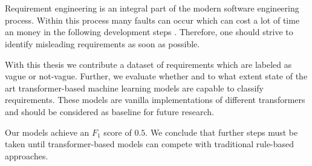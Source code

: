 \chapter{\abstractname}

Requirement engineering is an integral part of the modern software engineering process.
Within this process many faults can occur which can cost a lot of time an money in the following development steps \parencite{Mendez:2016}.
Therefore, one should strive to identify misleading requirements as soon as possible.

With this thesis we contribute a dataset of requirements which are labeled as vague or not-vague.
Further, we evaluate whether and to what extent state of the art transformer-based machine learning models are capable to classify requirements.
These models are vanilla implementations of different transformers and should be considered as baseline for future research.

Our models achieve an $F_1$ score of $0.5$.
We conclude that further steps must be taken until transformer-based models can compete with traditional rule-based approaches.
